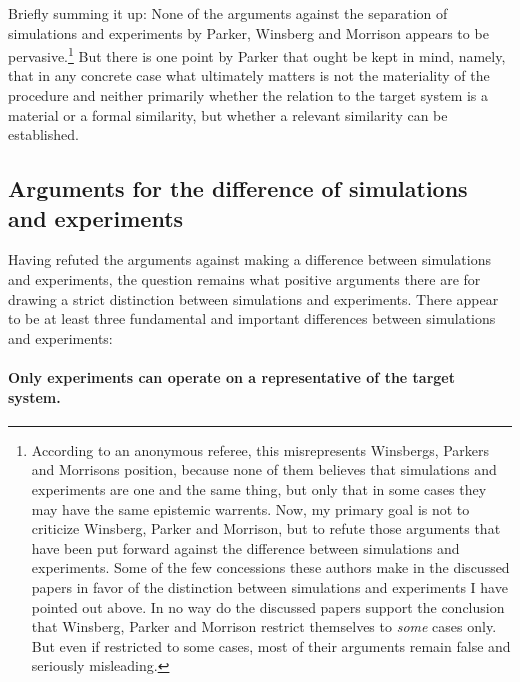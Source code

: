 \documentclass[12pt, a4paper]{article}
\numberwithin{equation}{section}
\begin{document}
Briefly summing it up: None of the arguments against the separation of simulations and experiments by Parker, Winsberg and Morrison appears to be pervasive.\footnote{According to an anonymous referee, this misrepresents Winsbergs, Parkers and Morrisons position, because none of them believes that simulations and experiments are one and the same thing, but only that in some cases they may have the same epistemic warrents. Now, my primary goal is not to criticize Winsberg, Parker and Morrison, but to refute those arguments that have been put forward against the difference between simulations and experiments. Some of the few concessions these authors make in the discussed papers in favor of the distinction between simulations and experiments I have pointed out above. In no way do the discussed papers support the conclusion that Winsberg, Parker and Morrison restrict themselves to {\em some} cases only. But even if restricted to some cases, most of their arguments remain false and seriously misleading. 
} But there is one point by Parker that ought be kept in mind, namely, that in any concrete case what ultimately matters is not the materiality of the procedure and neither primarily whether the relation to the target system is a material or a formal similarity, but whether a relevant similarity can be established.

\subsection{Arguments for the difference of simulations and experiments}
\label{Differences}

Having refuted the arguments against making a difference between simulations and experiments, the question remains what positive arguments there are for drawing a strict distinction between simulations and experiments. There appear to be at least three fundamental and important differences between simulations and experiments:

\paragraph{Only experiments can operate on a representative of the target system.}
\end{document}
